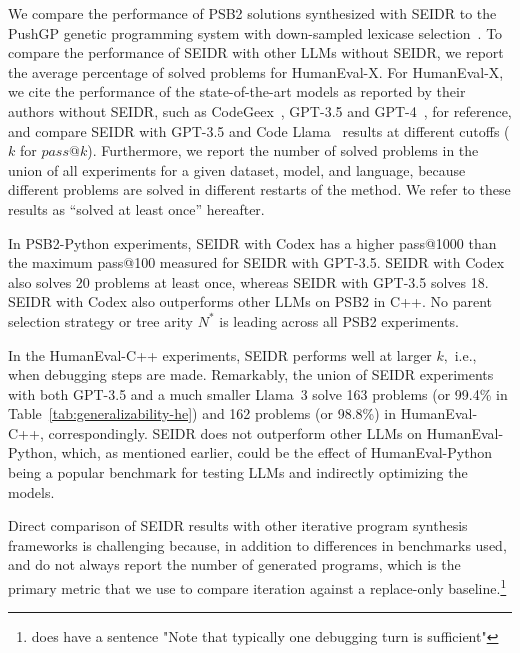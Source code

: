We compare the performance of PSB2 solutions synthesized with SEIDR to the PushGP genetic programming system with down-sampled lexicase selection~\cite{helmuth2022:problemsolving}. 
To compare the performance of SEIDR with other LLMs without SEIDR, we report the average percentage of solved problems for HumanEval-X. 
For HumanEval-X, we cite the performance of the state-of-the-art models as reported by their authors without SEIDR, such as CodeGeex~\cite{zheng2023:codegeex}, GPT-3.5 and GPT-4~\cite{openai2023:gpt4}, for reference, and compare SEIDR with GPT-3.5 and Code Llama~\cite{roziere2023:code} results at different cutoffs ($k$ for $pass@k$).
Furthermore, we report the number of solved problems in the union of all experiments for a given dataset, model, and language, because different problems are solved in different restarts of the method. 
We refer to these results as ``solved at least once'' hereafter.

In PSB2-Python experiments, SEIDR with Codex has a higher pass@1000 than the maximum pass@100 measured for SEIDR with GPT-3.5. SEIDR with Codex also solves 20 problems at least once, whereas SEIDR with GPT-3.5 solves 18.
SEIDR with Codex also outperforms other LLMs on PSB2 in C++.
No parent selection strategy or tree arity $N^*$ is leading across all PSB2 experiments. 

In the HumanEval-C++ experiments, SEIDR performs well at larger $k,$ i.e., when debugging steps are made. 
Remarkably, the union of SEIDR experiments with both GPT-3.5 and a much smaller Llama~3 solve 163 problems (or 99.4\% in Table~\ref{tab:generalizability-he}) and 162 problems (or 98.8\%) in HumanEval-C++, correspondingly.
SEIDR does not outperform other LLMs on HumanEval-Python, which, as mentioned earlier, could be the effect of HumanEval-Python being a popular benchmark for testing LLMs and indirectly optimizing the models.

Direct comparison of SEIDR results with other iterative program synthesis frameworks is challenging because, in addition to differences in benchmarks used, \cite{jiangSelfEvolveCodeEvolution2023} and \cite{chenTeachingLargeLanguage2023} do not always report the number of generated programs, which is the primary metric that we use to compare iteration against a replace-only baseline.\footnote{\cite{chenTeachingLargeLanguage2023} does have a sentence "Note that typically one debugging turn is sufficient"}


